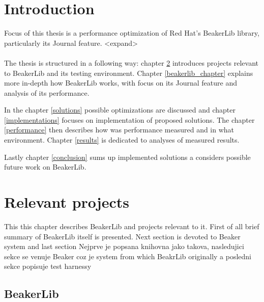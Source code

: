 
\chapter{Introduction}

Focus of this thesis is a performance optimization of Red Hat's BeakerLib library, particularly its Journal feature. <expand>
\\
\\
The thesis is structured in a following way: chapter \ref{relevant_projects} introduces projects relevant to BeakerLib and its testing environment. Chapter \ref{beakerlib_chapter} explains more in-depth how BeakerLib works, with focus on its Journal feature and analysis of its performance. 

In the chapter \ref{solutions} possible optimizations are discussed and chapter \ref{implementations} focuses on implementation of proposed solutions. The chapter \ref{performance} then describes how was performance measured and in what environment. Chapter \ref{results}  is dedicated to analyses of measured results. 

Lastly chapter \ref{conclusion} sums up implemented solutions a  considers possible future work on BeakerLib.

\chapter{Relevant projects}
\label{relevant_projects}

This this chapter describes BeakerLib and projects relevant to it. First of all brief summary of BeakerLib itself is presented. Next section is devoted to Beaker system and last section  Nejprve je popsana knihovna jako takova, nasledujici sekce se venuje Beaker coz je system from which BeakrLib originally  a posledni sekce popisuje test harnessy

\section{BeakerLib}

